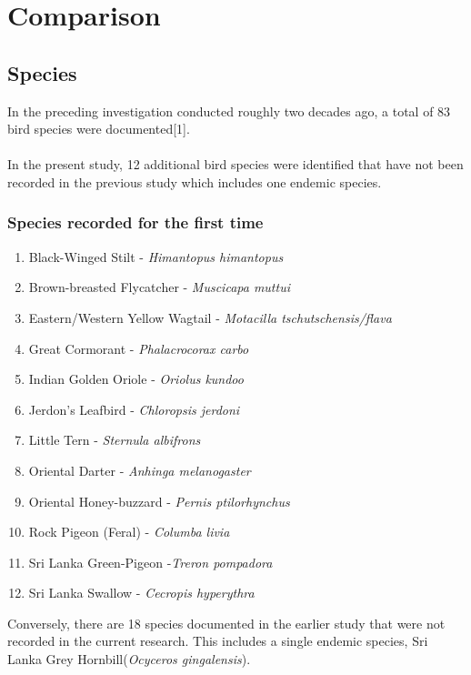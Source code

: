 \chapter{Comparison}
\label{cp:Comparative}
\section{Species}
In the preceding investigation conducted roughly two decades ago, a total of 83 bird species were documented[1]. 
\\\\
In the present study, 12 additional bird species were identified that have not been recorded in the previous study which includes one endemic species. 

\begin{importantbox}
\subsection{Species recorded for the first time}
\begin{enumerate}
    \item Black-Winged Stilt - \textit{Himantopus himantopus}
    \item Brown-breasted Flycatcher - \textit{Muscicapa muttui}
    \item Eastern/Western Yellow Wagtail - \textit{Motacilla tschutschensis/flava}
    \item Great Cormorant - \textit{Phalacrocorax carbo}
    \item Indian Golden Oriole - \textit{Oriolus kundoo}
    \item Jerdon's Leafbird - \textit{Chloropsis jerdoni}
    \item Little Tern - \textit{Sternula albifrons}
    \item Oriental Darter - \textit{Anhinga melanogaster}
    \item Oriental Honey-buzzard - \textit{Pernis ptilorhynchus}
    \item Rock Pigeon (Feral) - \textit{Columba livia}
    \item Sri Lanka Green-Pigeon -\textit{Treron pompadora}
    \item Sri Lanka Swallow - \textit{Cecropis hyperythra}
\end{enumerate}
\end{importantbox}

Conversely, there are 18 species documented in the earlier study that were not recorded in the current research. This includes a single endemic species, Sri Lanka Grey Hornbill(\textit{Ocyceros gingalensis}).
